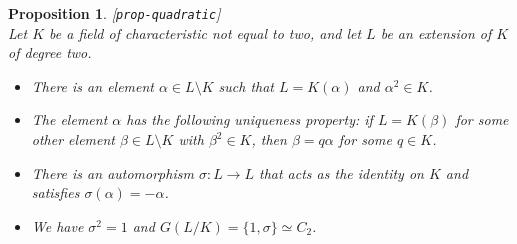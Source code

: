 \documentclass{amsart}
\newcommand{\lbl}[1]{\label{#1}\textup{[\texttt{#1}]}\ \\}
\newcommand{\lbl}{\label}
\newcommand{\al}        {\alpha}
\newcommand{\bt}        {\beta}
\newcommand{\sg}        {\sigma}
\newcommand{\sm}        {\setminus}
\renewcommand{\:}{\colon}
\newtheorem{proposition}[theorem]{Proposition}
\theoremstyle{definition}
\begin{document}
\begin{proposition}\lbl{prop-quadratic}
 Let $K$ be a field of characteristic not equal to two, and let $L$ be
 an extension of $K$ of degree two.
 \begin{itemize}
  \item[(a)] There is an element $\al\in L\sm K$ such that $L=K(\al)$
   and $\al^2\in K$.
  \item[(b)] The element $\al$ has the following uniqueness property:
   if $L=K(\bt)$ for some other element $\bt\in L\sm K$ with
   $\bt^2\in K$, then $\bt=q\al$ for some $q\in K$.
  \item[(c)] There is an automorphism $\sg\:L\to L$ that acts as the
   identity on $K$ and satisfies $\sg(\al)=-\al$.
  \item[(d)] We have $\sg^2=1$ and $G(L/K)=\{1,\sg\}\simeq C_2$.
 \end{itemize}
\end{proposition}
\end{document}
